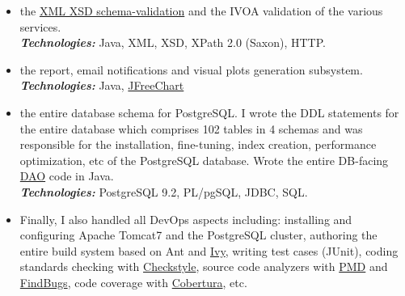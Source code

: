 \documentclass[10pt,a4paper]{article} %
\newcommand{\technologies}[0]{\textbf{\textit{Technologies:}}}
\begin{document}
{{{\begin{itemize}
    generation by tools like \href{https://docs.oracle.com/javase/6/docs/technotes/tools/share/xjc.html}{XJC} (which I have documented in \href{http://stackoverflow.com/q/17265960/274677}{SO} and raised
    against the tool's \href{https://java.net/jira/browse/JAXB-965}{JIRA}). So I decided to implement
    my own \href{https://docs.oracle.com/javase/6/docs/technotes/tools/share/wsimport.html}{wsimport}-like tool that reads WSDL and generates Java code (stubs and skeletons) to perform SOAP calls.\\
    \technologies{} Java, SOAP (Jersey), XSD, template-based code generation with \href{http://www.stringtemplate.org/.}{String Template}
  \item the \href{https://en.wikipedia.org/wiki/XML_Schema_(W3C)}{XML XSD schema-validation}
    and the IVOA validation of the various services.
    \\
    \technologies{} Java, XML, XSD, XPath 2.0 (Saxon), HTTP.
  \item the report, email notifications and visual plots generation subsystem.
    \\
    \technologies{} Java, \href{http://www.jfree.org/jfreechart/}{JFreeChart}
    \item the entire database schema for PostgreSQL. I wrote the DDL statements for the entire database which comprises 102 tables in 4 schemas and was responsible for the installation, fine-tuning, index creation, performance optimization, etc of the PostgreSQL database. Wrote the entire DB-facing \href{https://en.wikipedia.org/wiki/Database_abstraction_layer}{DAO} code in Java.\\
      \technologies{} PostgreSQL 9.2, PL/pgSQL, JDBC, SQL.
    \item Finally, I also handled all DevOps aspects including: installing and configuring Apache Tomcat7 and the PostgreSQL cluster, authoring the entire build system based on
      Ant and \href{http://ant.apache.org/ivy/}{Ivy}, writing test cases (JUnit), coding standards checking with \href{http://checkstyle.sourceforge.net/}{Checkstyle}, source code analyzers with
      \href{https://pmd.github.io/}{PMD} and \href{http://findbugs.sourceforge.net/}{FindBugs},
      code coverage with \href{http://cobertura.github.io/cobertura/}{Cobertura}, etc.
  \end{itemize}

}}

}

\end{document}
